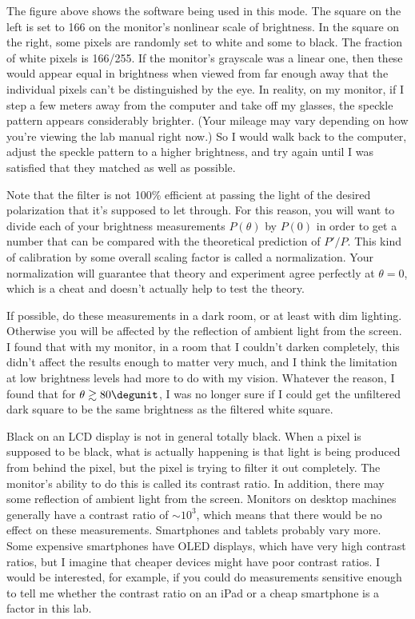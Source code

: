 
The figure above shows the software being used in this mode. The square on the left
is set to 166 on the monitor's nonlinear scale of brightness. In the square on the right,
some pixels are randomly set to white and some to black. The fraction of white pixels
is 166/255. If the monitor's grayscale was a linear one, then these would appear
equal in brightness when viewed from far enough away that the individual pixels can't
be distinguished by the eye. In reality, on my monitor, if I step a few meters away from the computer and
take off my glasses, the speckle pattern appears considerably brighter. (Your mileage may
vary depending on how you're viewing the lab manual right now.) So I would walk back to the
computer, adjust the speckle pattern to a higher brightness, and try again until I was
satisfied that they matched as well as possible.

Note that the filter is not 100\% efficient at passing the light of the desired polarization
that it's supposed to let through. For this reason, you will want to divide each of your
brightness measurements $P(\theta)$ by $P(0)$ in order to get a number that can be
compared with the theoretical prediction of $P'/P$. This kind of calibration by
some overall scaling factor is called a normalization. Your normalization will guarantee
that theory and experiment agree perfectly at $\theta=0$, which is a cheat and doesn't
actually help to test the theory.

If possible, do these measurements in a dark room, or at least with dim lighting. Otherwise
you will be affected by the reflection of ambient light from the screen.
I found that with my monitor, in a room that I couldn't darken completely,
this didn't affect the results enough to matter very much, and I think the limitation
at low brightness levels had more to do with my vision.
Whatever the reason, I found that for $\theta\gtrsim 80\degunit$, I was no longer sure if I could
get the unfiltered dark square to be the same brightness as the filtered white square.


Black on an LCD display is not in general totally black. When a pixel is supposed to be black,
what is actually happening is that light is being produced from behind the pixel, but the pixel
is trying to filter it out completely. The monitor's ability to do this is called its contrast
ratio. In addition, there may some reflection of ambient light from the screen. Monitors on
desktop machines generally have a contrast ratio of $\sim10^3$, which means that there would
be no effect on these measurements. Smartphones and tablets probably vary more. Some expensive
smartphones have OLED displays, which have very high contrast ratios, but I imagine that cheaper
devices might have poor contrast ratios. I would be interested, for example, if you could do
measurements sensitive enough to tell me whether the contrast ratio on an iPad or a cheap
smartphone is a factor in this lab.

